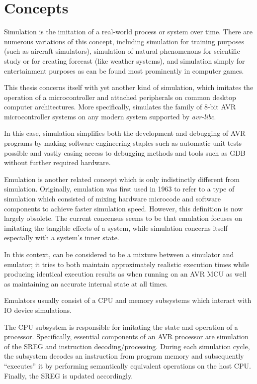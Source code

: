
\chapter{Concepts} \label{chapter:concepts}

Simulation is the imitation of a real-world process or system over time\cite{wiki:simulation}.
There are numerous variations of this concept, including simulation for training purposes
(such as aircraft simulators), simulation of natural phenomenons for scientific study
or for creating forecast (like weather systems), and simulation simply for entertainment purposes
as can be found most prominently in computer games.

This thesis concerns itself with yet another kind of simulation, which imitates
the operation of a microcontroller and attached peripherals on common desktop computer architectures. More
specifically, \simavr simulates the family of 8-bit \ac{AVR} microcontroller systems
on any modern system supported by \emph{avr-libc}.

In this case, simulation simplifies both the development and debugging of \ac{AVR}
programs by making software engineering staples such as automatic unit tests possible
and vastly easing access to debugging methods and tools such as \ac{GDB} without further
required hardware.

Emulation is another related concept which is only indistinctly different from
simulation. Originally, emulation was first used in 1963 to refer to a type
of simulation which consisted of mixing hardware microcode and software components
to achieve faster simulation speed\cite{building_ibm}. However, this definition is now
largely obsolete. The current concensus seems to be that emulation focuses on imitating
the tangible effects of a system, while simulation concerns itself especially with
a system's inner state.

In this context, \simavr can be considered to be a mixture between a simulator and
emulator; it tries to both maintain approximately realistic execution times while
producing identical execution results as when running on an \ac{AVR} \ac{MCU} as
well as maintaining an accurate internal state at all times.

Emulators usually consist of a \ac{CPU} and memory subsystems which interact with
\ac{IO} device simulations\cite{wiki:emulation}.

The \ac{CPU} subsystem is responsible
for imitating the state and operation of a processor. Specifically, essential components of an \ac{AVR}
processor are simulation of the \ac{SREG} and instruction decoding/processing.
During each simulation cycle, the subsystem decodes an instruction from program memory
and subsequently ``executes'' it by performing semantically equivalent operations on
the host \ac{CPU}. Finally, the \ac{SREG} is updated accordingly.


